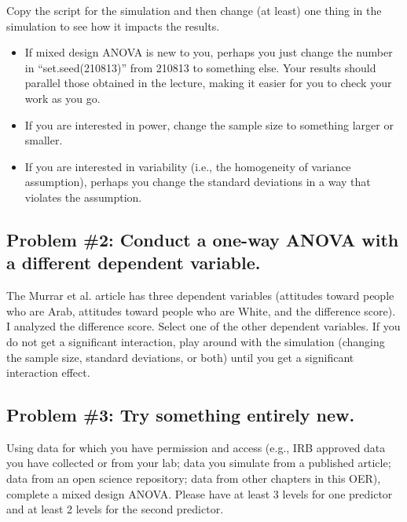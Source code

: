 \documentclass[
  11pt,
]{book}
\providecommand{\tightlist}{%
  \setlength{\itemsep}{0pt}\setlength{\parskip}{0pt}}
\begin{document}
Copy the script for the simulation and then change (at least) one thing in the simulation to see how it impacts the results.

\begin{itemize}
\tightlist
\item
  If mixed design ANOVA is new to you, perhaps you just change the number in ``set.seed(210813)'' from 210813 to something else. Your results should parallel those obtained in the lecture, making it easier for you to check your work as you go.
\item
  If you are interested in power, change the sample size to something larger or smaller.
\item
  If you are interested in variability (i.e., the homogeneity of variance assumption), perhaps you change the standard deviations in a way that violates the assumption.
\end{itemize}

\hypertarget{problem-2-conduct-a-one-way-anova-with-a-different-dependent-variable.}{%
\subsection{Problem \#2: Conduct a one-way ANOVA with a different dependent variable.}\label{problem-2-conduct-a-one-way-anova-with-a-different-dependent-variable.}}

The Murrar et al. \citeyearpar{murrar_entertainment-education_2018} article has three dependent variables (attitudes toward people who are Arab, attitudes toward people who are White, and the difference score). I analyzed the difference score. Select one of the other dependent variables. If you do not get a significant interaction, play around with the simulation (changing the sample size, standard deviations, or both) until you get a significant interaction effect.

\hypertarget{problem-3-try-something-entirely-new.-2}{%
\subsection{Problem \#3: Try something entirely new.}\label{problem-3-try-something-entirely-new.-2}}

Using data for which you have permission and access (e.g., IRB approved data you have collected or from your lab; data you simulate from a published article; data from an open science repository; data from other chapters in this OER), complete a mixed design ANOVA. Please have at least 3 levels for one predictor and at least 2 levels for the second predictor.
\end{document}
